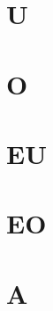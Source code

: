 \begin{multicols*}{2}
\section{U}

\section{O}

\section{EU}

\section{EO}

\section{A}

\end{multicols*}